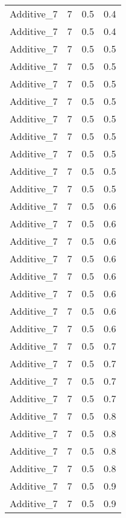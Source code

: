 \documentclass{article}
\begin{document}
\begin{longtable}[H]{lrrr}
 Additive\_7 &       7 &   0.5 &            0.4 \\
 Additive\_7 &       7 &   0.5 &            0.4 \\
 Additive\_7 &       7 &   0.5 &            0.5 \\
 Additive\_7 &       7 &   0.5 &            0.5 \\
 Additive\_7 &       7 &   0.5 &            0.5 \\
 Additive\_7 &       7 &   0.5 &            0.5 \\
 Additive\_7 &       7 &   0.5 &            0.5 \\
 Additive\_7 &       7 &   0.5 &            0.5 \\
 Additive\_7 &       7 &   0.5 &            0.5 \\
 Additive\_7 &       7 &   0.5 &            0.5 \\
 Additive\_7 &       7 &   0.5 &            0.5 \\
 Additive\_7 &       7 &   0.5 &            0.6 \\
 Additive\_7 &       7 &   0.5 &            0.6 \\
 Additive\_7 &       7 &   0.5 &            0.6 \\
 Additive\_7 &       7 &   0.5 &            0.6 \\
 Additive\_7 &       7 &   0.5 &            0.6 \\
 Additive\_7 &       7 &   0.5 &            0.6 \\
 Additive\_7 &       7 &   0.5 &            0.6 \\
 Additive\_7 &       7 &   0.5 &            0.6 \\
 Additive\_7 &       7 &   0.5 &            0.7 \\
 Additive\_7 &       7 &   0.5 &            0.7 \\
 Additive\_7 &       7 &   0.5 &            0.7 \\
 Additive\_7 &       7 &   0.5 &            0.7 \\
 Additive\_7 &       7 &   0.5 &            0.8 \\
 Additive\_7 &       7 &   0.5 &            0.8 \\
 Additive\_7 &       7 &   0.5 &            0.8 \\
 Additive\_7 &       7 &   0.5 &            0.8 \\
 Additive\_7 &       7 &   0.5 &            0.9 \\
 Additive\_7 &       7 &   0.5 &            0.9 \\

\end{longtable}
\end{document}
